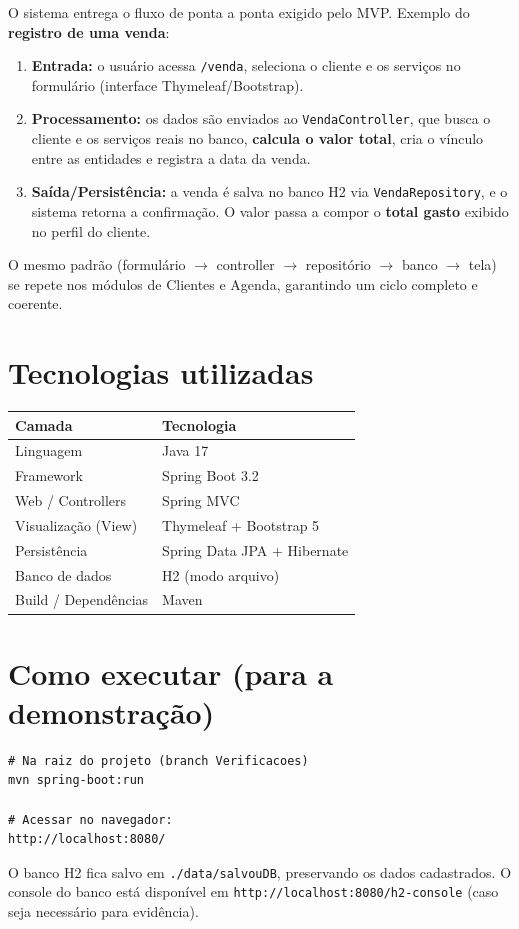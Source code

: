 \documentclass[12pt,a4paper]{article}
\begin{document}
O sistema entrega o fluxo de ponta a ponta exigido pelo MVP. Exemplo do
\textbf{registro de uma venda}:

\begin{enumerate}[leftmargin=*]
  \item \textbf{Entrada:} o usuário acessa \texttt{/venda}, seleciona o cliente e os
        serviços no formulário (interface Thymeleaf/Bootstrap).
  \item \textbf{Processamento:} os dados são enviados ao \texttt{VendaController}, que busca
        o cliente e os serviços reais no banco, \textbf{calcula o valor total}, cria o
        vínculo entre as entidades e registra a data da venda.
  \item \textbf{Saída/Persistência:} a venda é salva no banco H2 via \texttt{VendaRepository},
        e o sistema retorna a confirmação. O valor passa a compor o \textbf{total gasto}
        exibido no perfil do cliente.
\end{enumerate}

O mesmo padrão (formulário $\rightarrow$ controller $\rightarrow$ repositório $\rightarrow$
banco $\rightarrow$ tela) se repete nos módulos de Clientes e Agenda, garantindo um ciclo
completo e coerente.

\section{Tecnologias utilizadas}

\begin{center}
\begin{tabular}{ll}
\toprule
\textbf{Camada} & \textbf{Tecnologia} \\
\midrule
Linguagem              & Java 17 \\
Framework              & Spring Boot 3.2 \\
Web / Controllers      & Spring MVC \\
Visualização (View)    & Thymeleaf + Bootstrap 5 \\
Persistência           & Spring Data JPA + Hibernate \\
Banco de dados         & H2 (modo arquivo) \\
Build / Dependências   & Maven \\
\bottomrule
\end{tabular}
\end{center}

\section{Como executar (para a demonstração)}

\begin{lstlisting}
# Na raiz do projeto (branch Verificacoes)
mvn spring-boot:run

# Acessar no navegador:
http://localhost:8080/
\end{lstlisting}

O banco H2 fica salvo em \texttt{./data/salvouDB}, preservando os dados cadastrados.
O console do banco está disponível em \texttt{http://localhost:8080/h2-console}
(caso seja necessário para evidência).
\end{document}
